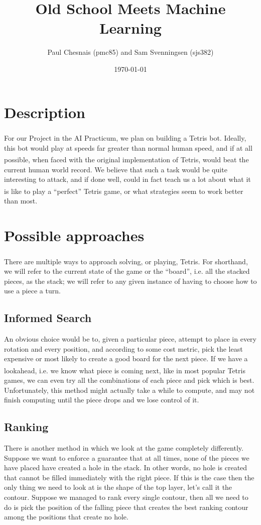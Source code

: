 \documentclass{article}
\title{Old School \tetris{} Meets Machine Learning}
\author{Paul Chesnais (pmc85) and Sam Svenningsen (sjs382)}
\date{\today}
\def\tetris{Tetris\textsuperscript{\textregistered}}
\begin{document}
\maketitle
\thispagestyle{empty}

\section{Description}

\par For our Project in the AI Practicum, we plan on building a \tetris{} bot. Ideally, this bot would play at speeds far greater than normal human speed, and if at all possible, when faced with the original implementation of \tetris{}, would beat the current human world record. We believe that such a task would be quite interesting to attack, and if done well, could in fact teach us a lot about what it is like to play a ``perfect'' \tetris{} game, or what strategies seem to work better than most.



\section{Possible approaches}

\par There are multiple ways to approach solving, or playing, \tetris{}. For shorthand, we will refer to the current state of the game or the ``board'', i.e. all the stacked pieces, as the stack; we will refer to any given instance of having to choose how to use a piece a turn.

\subsection{Informed Search}
An obvious choice would be to, given a particular piece, attempt to place in every rotation and every position, and according to some cost metric, pick the least expensive or most likely to create a good board for the next piece. If we have a lookahead, i.e. we know what piece is coming next, like in most popular \tetris{} games, we can even try all the combinations of each piece and pick which is best. Unfortunately, this method might actually take a while to compute, and may not finish computing until the piece drops and we lose control of it.

\subsection{Ranking}
There is another method in which we look at the game completely differently. Suppose we want to enforce a guarantee that at all times, none of the pieces we have placed have created a hole in the stack. In other words, no hole is created that cannot be filled immediately with the right piece. If this is the case then the only thing we need to look at is the shape of the top layer, let's call it the contour. Suppose we managed to rank every single contour, then all we need to do is pick the position of the falling piece that creates the best ranking contour among the positions that create no hole.
\end{document}
